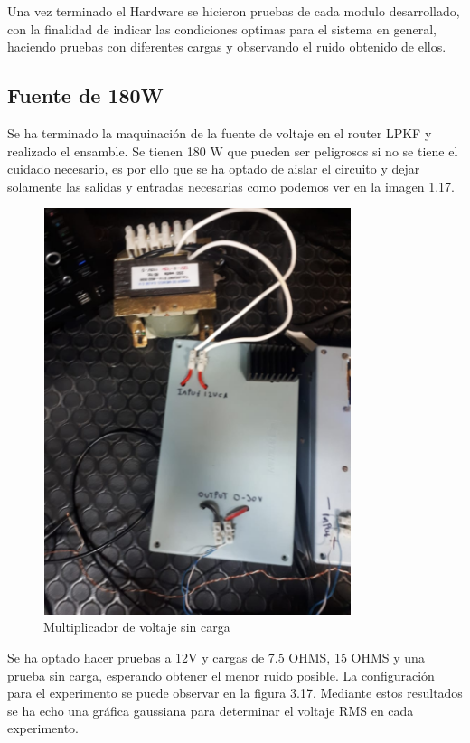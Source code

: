 Una vez terminado el Hardware se hicieron pruebas de cada modulo desarrollado, con la finalidad de indicar las condiciones optimas para el sistema en general, haciendo pruebas con diferentes cargas y observando el ruido obtenido de ellos. 

\subsection{Fuente de 180W}

Se ha terminado la maquinación de la fuente de voltaje en el router LPKF y realizado el ensamble. Se tienen 180 W que pueden ser peligrosos si no se tiene el cuidado necesario, es por ello que se ha optado de aislar el circuito y dejar solamente las salidas y entradas necesarias como podemos ver en la imagen 1.17.

\begin{figure}[H]
\centering
\includegraphics[width=9cm]{Capitulo3/figs/fotofuente.png}
\caption{Multiplicador de voltaje sin carga}
\end{figure}

Se ha optado hacer pruebas a 12V y cargas de 7.5 OHMS, 15 OHMS y una prueba sin carga, esperando obtener el menor ruido posible. La configuración para el experimento se puede observar en la figura 3.17. Mediante estos resultados se ha echo una gráfica gaussiana para determinar el voltaje RMS en cada experimento. 



